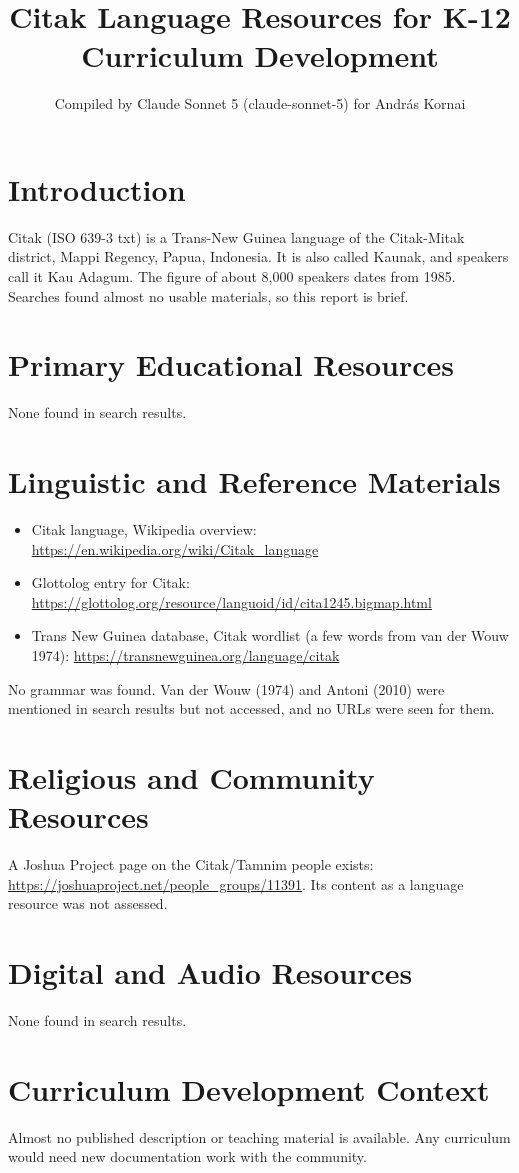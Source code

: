 \documentclass[12pt]{article}
\title{Citak Language Resources for K-12 Curriculum Development}
\author{Compiled by Claude Sonnet 5 (claude-sonnet-5) for Andr\'as Kornai}
\date{}
\begin{document}
\maketitle
\section{Introduction}
Citak (ISO 639-3 txt) is a Trans-New Guinea language of the Citak-Mitak district, Mappi Regency, Papua, Indonesia. It is also called Kaunak, and speakers call it Kau Adagum. The figure of about 8,000 speakers dates from 1985. Searches found almost no usable materials, so this report is brief.
\section{Primary Educational Resources}
None found in search results.
\section{Linguistic and Reference Materials}
\begin{itemize}
\item Citak language, Wikipedia overview: \url{https://en.wikipedia.org/wiki/Citak_language}
\item Glottolog entry for Citak: \url{https://glottolog.org/resource/languoid/id/cita1245.bigmap.html}
\item Trans New Guinea database, Citak wordlist (a few words from van der Wouw 1974): \url{https://transnewguinea.org/language/citak}
\end{itemize}
No grammar was found. Van der Wouw (1974) and Antoni (2010) were mentioned in search results but not accessed, and no URLs were seen for them.
\section{Religious and Community Resources}
A Joshua Project page on the Citak/Tamnim people exists: \url{https://joshuaproject.net/people_groups/11391}. Its content as a language resource was not assessed.
\section{Digital and Audio Resources}
None found in search results.
\section{Curriculum Development Context}
Almost no published description or teaching material is available. Any curriculum would need new documentation work with the community.
\end{document}
